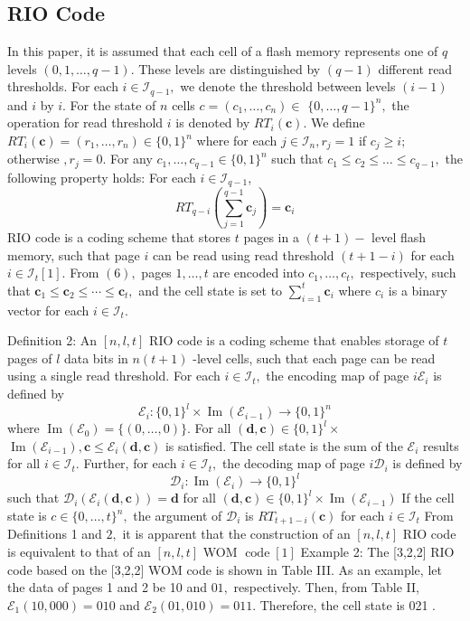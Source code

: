 \documentclass{article}
\begin{document}
\subsection{RIO Code}
In this paper, it is assumed that each cell of a flash memory represents one of $q$ levels $(0,1, \ldots, q-1) .$ These levels are distinguished by $(q-1)$ different read thresholds. For each $i \in \mathcal{I}_{q-1},$ we denote the threshold between levels $(i-1)$ and $i$ by $i .$ For the state of $n$ cells $c=\left(c_{1}, \ldots, c_{n}\right) \in$ $\{0, \ldots, q-1\}^{n},$ the operation for read threshold $i$ is denoted by $R T_{i}(\boldsymbol{c}) .$ We define $R T_{i}(\boldsymbol{c})=\left(r_{1}, \ldots, r_{n}\right) \in\{0,1\}^{n}$ where
for each $j \in \mathcal{I}_{n}, r_{j}=1$ if $c_{j} \geq i ;$ otherwise $, r_{j}=0 .$ For any $c_{1}, \ldots, c_{q-1} \in\{0,1\}^{n}$ such that $c_{1} \leq c_{2} \leq \ldots \leq c_{q-1},$ the
following property holds: For each $i \in \mathcal{I}_{q-1}$,
$$
R T_{q-i}\left(\sum_{j=1}^{q-1} \boldsymbol{c}_{j}\right)=\boldsymbol{c}_{i}
$$
RIO code is a coding scheme that stores $t$ pages in a $(t+1)-$ level flash memory, such that page $i$ can be read using read threshold $(t+1-i)$ for each $i \in \mathcal{I}_{t}[1] .$ From $(6),$ pages $1, \ldots, t$ are encoded into $c_{1}, \ldots, c_{t},$ respectively, such that $\boldsymbol{c}_{1} \leq \boldsymbol{c}_{2} \leq \cdots \leq \boldsymbol{c}_{t},$ and the cell state is set to $\sum_{i=1}^{t} \boldsymbol{c}_{i}$
where $c_{i}$ is a binary vector for each $i \in \mathcal{I}_{t}$. 

Definition 2: An $[n, l, t]$ RIO code is a coding scheme that enables storage of $t$ pages of $l$ data bits in $n(t+1)$ -level cells, such that each page can be read using a single read threshold. For each $i \in \mathcal{I}_{t},$ the encoding map of page $i \mathcal{E}_{i}$ is defined by
$$
\mathcal{E}_{i}:\{0,1\}^{l} \times \operatorname{Im}\left(\mathcal{E}_{i-1}\right) \rightarrow\{0,1\}^{n}
$$
where $\operatorname{Im}\left(\mathcal{E}_{0}\right)=\{(0, \ldots, 0)\} .$ For all $(\boldsymbol{d}, \boldsymbol{c}) \in\{0,1\}^{l} \times$
$\operatorname{Im}\left(\mathcal{E}_{i-1}\right), \boldsymbol{c} \leq \mathcal{E}_{i}(\boldsymbol{d}, \boldsymbol{c})$ is satisfied. The cell state is the sum
of the $\mathcal{E}_{i}$ results for all $i \in \mathcal{I}_{t} .$ Further, for each $i \in \mathcal{I}_{t},$ the decoding map of page $i \mathcal{D}_{i}$ is defined by
$$
\mathcal{D}_{i}: \operatorname{Im}\left(\mathcal{E}_{i}\right) \rightarrow\{0,1\}^{l}
$$
such that $\mathcal{D}_{i}\left(\mathcal{E}_{i}(\boldsymbol{d}, \boldsymbol{c})\right)=\boldsymbol{d}$ for all $(\boldsymbol{d}, \boldsymbol{c}) \in\{0,1\}^{l} \times \operatorname{Im}\left(\mathcal{E}_{i-1}\right)$
If the cell state is $c \in\{0, \ldots, t\}^{n},$ the argument of $\mathcal{D}_{i}$ is $R T_{t+1-i}(\boldsymbol{c})$ for each $i \in \mathcal{I}_{t}$
From Definitions 1 and $2,$ it is apparent that the construction of an $[n, l, t]$ RIO code is equivalent to that of an $[n, l, t]$ WOM $\operatorname{code}[1]$
Example 2: The [3,2,2] RIO code based on the [3,2,2] WOM code is shown in Table III. As an example, let the data of pages 1 and 2 be 10 and $01,$ respectively. Then, from Table II, $\mathcal{E}_{1}(10,000)=010$ and $\mathcal{E}_{2}(01,010)=011 .$ Therefore, the cell state is 021 .
\end{document}
